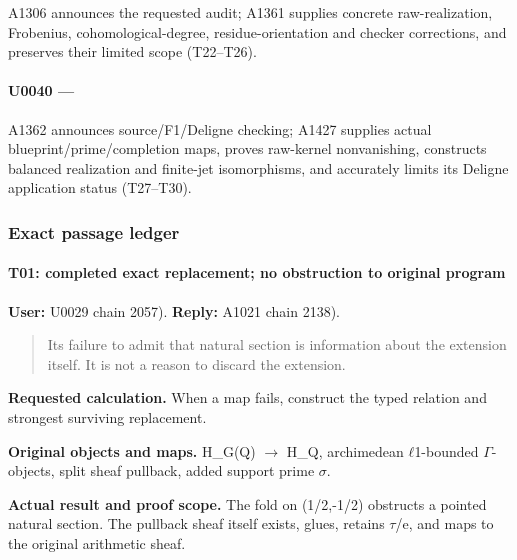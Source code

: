 A1306 announces the requested audit; A1361 supplies concrete
raw-realization, Frobenius, cohomological-degree, residue-orientation
and checker corrections, and preserves their limited scope (T22--T26).

\paragraph{\texorpdfstring{U0040 ---
\protect{}}{U0040 --- }}\label{u0040-a10456e9-7f72-4c81-bc00-118fcd575269}

A1362 announces source/F1/Deligne checking; A1427 supplies actual
blueprint/prime/completion maps, proves raw-kernel nonvanishing,
constructs balanced realization and finite-jet isomorphisms, and
accurately limits its Deligne application status (T27--T30).

\subsubsection{Exact passage ledger}\label{exact-passage-ledger}

\paragraph{T01: completed exact replacement; no obstruction to original
program}\label{t01-completed-exact-replacement-no-obstruction-to-original-program}

\textbf{User:} U0029
\protect{} chain 2057).
\textbf{Reply:} A1021
\protect{} chain 2138).

\begin{quote}
Its failure to admit that natural section is information about the
extension itself. It is not a reason to discard the extension.
\end{quote}

\textbf{Requested calculation.} When a map fails, construct the typed
relation and strongest surviving replacement.

\textbf{Original objects and maps.} H\_G(Q)
\allowbreak{}\ensuremath{→}\allowbreak{} H\_Q, archimedean
\allowbreak{}\ensuremath{ℓ}\allowbreak{}1-bounded
\allowbreak{}\ensuremath{Γ}\allowbreak{}-objects, split sheaf pullback,
added support prime \allowbreak{}\ensuremath{σ}\allowbreak{}.

\textbf{Actual result and proof scope.} The fold on (1/2,-1/2) obstructs
a pointed natural section. The pullback sheaf itself exists, glues,
retains \allowbreak{}\ensuremath{τ}\allowbreak{}/e, and maps to the
original arithmetic sheaf.

